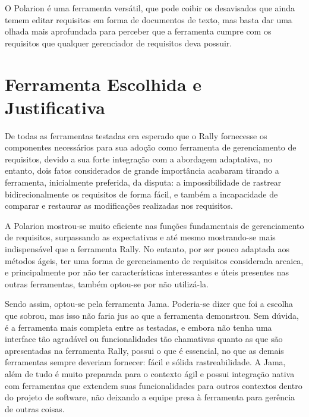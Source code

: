 O Polarion é uma ferramenta versátil, que pode coibir os desavisados que ainda temem editar requisitos em forma de documentos de texto, mas basta dar uma olhada mais aprofundada para perceber que a ferramenta cumpre com os requisitos que qualquer gerenciador de requisitos deva possuir.

\section{Ferramenta Escolhida e Justificativa}

De todas as ferramentas testadas era esperado que o Rally fornecesse os componentes necessários para sua adoção como ferramenta de gerenciamento de requisitos, devido a sua forte integração com a abordagem adaptativa, no entanto, dois fatos considerados de grande importância acabaram tirando a ferramenta, inicialmente preferida, da disputa: a impossibilidade de rastrear bidirecionalmente os requisitos de forma fácil, e também a incapacidade de comparar e restaurar as modificações realizadas nos requisitos.

A Polarion mostrou-se muito eficiente nas funções fundamentais de gerenciamento de requisitos, surpassando as expectativas e até mesmo mostrando-se mais indispensável que a ferramenta Rally. No entanto, por ser pouco adaptada aos métodos ágeis, ter uma forma de gerenciamento de requisitos considerada arcaica, e principalmente por não ter características interessantes e úteis presentes nas outras ferramentas, também optou-se por não utilizá-la.

Sendo assim, optou-se pela ferramenta Jama. Poderia-se dizer que foi a escolha que sobrou, mas isso não faria jus ao que a ferramenta demonstrou. Sem dúvida, é a ferramenta mais completa entre as testadas, e embora não tenha uma interface tão agradável ou funcionalidades tão chamativas quanto as que são apresentadas na ferramenta Rally, possui o que é essencial, no que as demais ferramentas sempre deveriam fornecer: fácil e sólida rastreabilidade. A Jama, além de tudo é muito preparada para o contexto ágil e possui integração nativa com ferramentas que extendem suas funcionalidades para outros contextos dentro do projeto de software, não deixando a equipe presa à ferramenta para gerência de outras coisas.